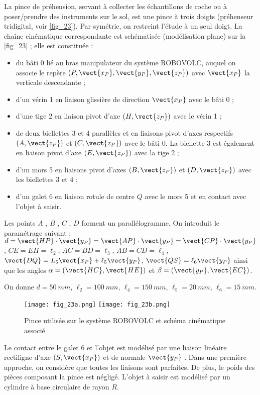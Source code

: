 La pince de préhension, servant à collecter les échantillons de roche ou à poser/prendre des
instruments sur le sol, est une pince à trois doigts (préhenseur tridigital, voir \autoref{fig_23}). Par
symétrie, on restreint l'étude à un seul doigt.
La chaîne cinématique correspondante est schématisée (modélisation plane) sur la \autoref{fig_23} ; elle
est constituée :
\begin{itemize}
\item du bâti 0 lié au bras manipulateur du système ROBOVOLC, auquel on associe le repère $\left(P,\vect{x_P},\vect{y_P},\vect{z_P}\right)$ avec
$\vect{x_P}$ la verticale descendante ;
\item  d'un vérin 1 en liaison glissière de direction $\vect{x_P}$ avec le bâti 0 ;
\item  d'une tige 2 en liaison pivot d'axe $\left(H,\vect{z_P}\right)$ avec le vérin 1 ;
\item  de deux biellettes 3 et 4 parallèles et en liaisons pivot d'axes respectifs $\left(A,\vect{z_P}\right)$ et $\left(C,\vect{z_P}\right)$
avec le bâti 0. La biellette 3 est également en liaison pivot d'axe $\left(E,\vect{z_P}\right)$ avec la tige 2 ;
\item  d'un mors 5 en liaisons pivot d'axes $\left(B,\vect{z_P}\right)$ et $\left(D,\vect{z_P}\right)$ avec les biellettes 3 et 4 ;
\item  d'un galet 6 en liaison rotule de centre $Q$ avec le mors 5 et en contact avec l'objet à saisir.
\end{itemize}
Les points $A$ , $B$ , $C$ , $D$ forment un parallélogramme. On introduit le paramétrage suivant :
$d=\vect{HP} \cdot \vect{y_P}=\vect{AP} \cdot \vect{y_P}=\vect{CP} \cdot \vect{y_P}$, 
$CE = EH = \ell_2$, 
$AC = BD = \ell_3$,
$AB = CD = \ell_4$,
$\vect{DQ} = L_5\vect{x_P} + \ell_5 \vect{y_P}$, 
$\vect{QS} = \ell_6\vect{y_P}$
ainsi que les angles
$\alpha = \left(\vect{HC},\vect{HE}\right)$
et  $\beta = \left(\vect{y_P},\vect{EC}\right)$.

On donne $d = \SI{50}{mm}$, $\ell_2 =\SI{100}{mm}$, $\ell_4 =\SI{150}{mm}$, $\ell_5 =\SI{20}{mm}$, $\ell_6 =\SI{15}{mm}$.

\begin{figure}[H]
\centering
\texttt{[image: fig\_23a.png]}
\texttt{[image: fig\_23b.png]}
\caption{Pince utilisée sur le système ROBOVOLC et schéma cinématique associé \label{fig_23}}
\end{figure}


Le contact entre le galet 6 et l'objet est modélisé par une liaison linéaire rectiligne d'axe $\left(S,\vect{x_P}\right)$ et
de normale $\vect{y_P}$ .
Dans une première approche, on considère que toutes les liaisons sont parfaites. De plus, le poids
des pièces composant la pince est négligé.
L'objet à saisir est modélisé par un cylindre à base circulaire de rayon $R$.
\fi


